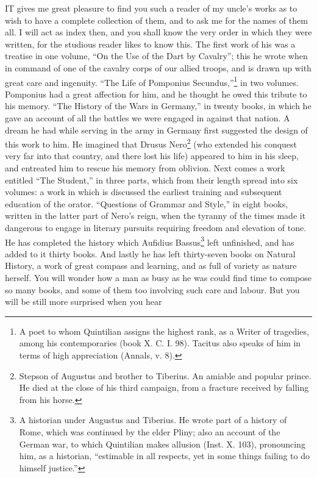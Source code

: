 IT gives me great pleasure to find you such a reader of my uncle's works
as to wish to have a complete collection of them, and to ask me for the
names of them all. I will act as index then, and you shall know the very
order in which they were written, for the studious reader likes to know
this. The first work of his was a treatise in one volume, ``On the Use of
the Dart by Cavalry''; this he wrote when in command of one of the cavalry
corps of our allied troops, and is drawn up with great care and ingenuity.
``The Life of Pomponius Secundus,''\footnote{A poet to whom Quintilian
assigns the highest rank, as a Writer of tragedies, among his
contemporaries (book X. C. I. 98). Tacitus also speaks of him in terms of
high appreciation (Annals, v. 8).} in two volumes.
Pomponius had a great affection for him, and he thought he owed this
tribute to his memory. ``The History of the Wars in Germany,'' in twenty
books, in which he gave an account of all the battles we were engaged in
against that nation. A dream he had while serving in the army in Germany
first suggested the design of this work to him. He imagined that Drusus
Nero\footnote{Stepson of Augustus and
brother to Tiberius. An amiable and popular prince. He died at the close
of his third campaign, from a fracture received by falling from his
horse.}
(who extended his conquest very far into that country, and there lost his
life) appeared to him in his sleep, and entreated him to rescue his memory
from oblivion. Next comes a work entitled ``The Student,'' in three parts,
which from their length spread into six volumes: a work in which is
discussed the earliest training and subsequent education of the orator.
``Questions of Grammar and Style,'' in eight books, written in the latter
part of Nero's reign, when the tyranny of the times made it dangerous to
engage in literary pursuits requiring freedom and elevation of tone. He
has completed the history which Aufidius Bassus\footnote{A historian under
Augustus and Tiberius. He wrote part of a history of Rome, which was
continued by the elder Pliny; also an account of the German war, to which
Quintilian makes allusion (Inst. X. 103), pronouncing him, as a historian,
``estimable in all respects, yet in some things failing to do himself
justice.''} left unfinished, and
has added to it thirty books. And lastly he has left thirty-seven books on
Natural History, a work of great compass and learning, and as full of
variety as nature herself. You will wonder how a man as busy as he was
could find time to compose so many books, and some of them too involving
such care and labour. But you will be still more surprised when you hear
